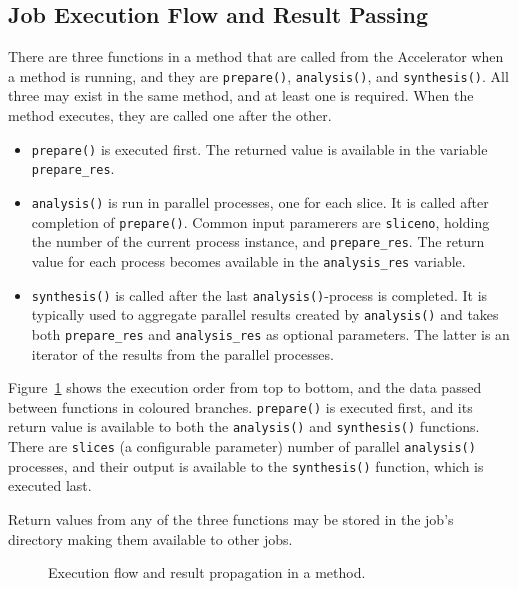 \documentclass[a4paper]{article}
\begin{document}
\clearpage




\subsection{Job Execution Flow and Result Passing}

There are three functions in a method that are called from the
Accelerator when a method is running, and they are \texttt{prepare()},
\texttt{analysis()}, and \texttt{synthesis()}.  All three may exist in
the same method, and at least one is required.  When the method
executes, they are called one after the other.
\begin{itemize}
\item[] \texttt{prepare()} is executed first.  The returned value is
  available in the variable \texttt{prepare\_res}.
\item[] \texttt{analysis()} is run in parallel processes, one for each
  slice.  It is called after completion of \texttt{prepare()}.  Common
  input paramerers are \texttt{sliceno}, holding the number of the
  current process instance, and \texttt{prepare\_res}.  The return
  value for each process becomes available in the
  \texttt{analysis\_res} variable.
\item[] \texttt{synthesis()} is called after the last
  \texttt{analysis()}-process is completed.  It is typically used to
  aggregate parallel results created by \texttt{analysis()} and takes
  both \texttt{prepare\_res} and \texttt{analysis\_res} as optional
  parameters.  The latter is an iterator of the results from the
  parallel processes.
\end{itemize}
Figure~\ref{fig:prepanasyn} shows the execution order from top to
bottom, and the data passed between functions in coloured branches.
\texttt{prepare()} is executed first, and its return value is
available to both the \texttt{analysis()} and \texttt{synthesis()}
functions.  There are \texttt{slices} (a configurable parameter)
number of parallel \texttt{analysis()} processes, and their output is
available to the \texttt{synthesis()} function, which is executed
last.

Return values from any of the three functions may be stored in the
job's directory making them available to other jobs.


\begin{figure}[h!]
  \begin{center}
    
    \caption{Execution flow and result propagation in a method.}
    \label{fig:prepanasyn}
  \end{center}
\end{figure}
\end{document}
